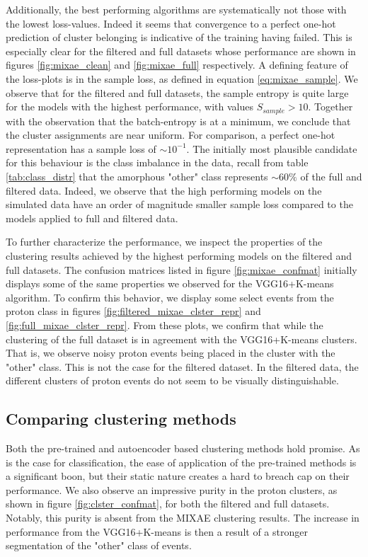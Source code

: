 Additionally, the best performing algorithms are systematically not those with the lowest loss-values. Indeed it seems that convergence to a perfect one-hot prediction of cluster belonging is indicative of the training having failed. This is especially clear for the filtered and full datasets whose performance are shown in figures \ref{fig:mixae_clean} and \ref{fig:mixae_full} respectively. A defining feature of the loss-plots is in the sample loss, as defined in equation \ref{eq:mixae_sample}. We observe that for the filtered and full datasets, the sample entropy is quite large for the models with the highest performance, with values $S_{sample} > 10$. Together with the observation that the batch-entropy is at a minimum, we conclude that the cluster assignments are near uniform. For comparison, a perfect one-hot representation has a sample loss of $\sim 10^{-1}$. The initially most plausible candidate for this behaviour is the class imbalance in the data, recall from table \ref{tab:class_distr} that the amorphous "other" class represents $\sim 60 \%$ of the full and filtered data. Indeed, we observe that the high performing models on the simulated data have an order of magnitude smaller sample loss compared to the models applied to full and filtered data. 

To further characterize the performance, we inspect the properties of the clustering results achieved by the highest performing models on the filtered and full datasets. The confusion matrices listed in figure \ref{fig:mixae_confmat} initially displays some of the same properties we observed for the VGG16+K-means algorithm. To confirm this behavior, we display some select events from the proton class in figures \ref{fig:filtered_mixae_clster_repr} and \ref{fig:full_mixae_clster_repr}. From these plots, we confirm that while the clustering of the full dataset is in agreement with the VGG16+K-means clusters. That is, we observe noisy proton events being placed in the cluster with the "other" class. This is not the case for the filtered dataset. In the filtered data, the different clusters of proton events do not seem to be visually distinguishable.

\subsection{Comparing clustering methods}

Both the pre-trained and autoencoder based clustering methods hold promise. As is the case for classification, the ease of application of the pre-trained methods is a significant boon, but their static nature creates a hard to breach cap on their performance. We also observe an impressive purity in the proton clusters, as shown in figure \ref{fig:clster_confmat}, for both the filtered and full datasets. Notably, this purity is absent from the MIXAE clustering results. The increase in performance from the VGG16+K-means is then a result of a stronger segmentation of the "other" class of events.

